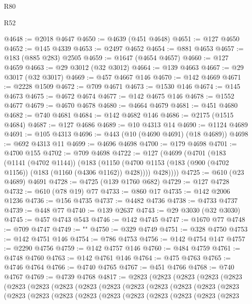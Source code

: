\begin{lexlean}{R80}
\begin{lexlean}{R52}
\begin{coremodule}
{{{{{{{{{{{{{{{{{{{{{{{{{{{{{{{{{{{{{{{{{{{{{{{{{{{{{{{{{{{{{{{{{{{{{{{{{{{{{{{{{{{{{{{{{{{{{{{{{{{{{{{{{{{{{{{{{{{{{{{{{{{{{{{{{{{{{{{{{{{{{{{{{{{{{{{{{{{{{{{{{{{{{{{{{{{{{{{{{{{{{{{{{{{{{{{{{{{{{{@4648 := @2018 @4647
@4650 := @4639 (@451 @4648)
@4651 := @127 @4650
@4652 := @145 @4339
@4653 := @2497 @4652
@4654 := @881 @4653
@4657 := @183 (@885 @283) @2505
@4659 := @1647 (@4654 @4657)
@4660 := @127 @4659
@4663 := @29 @3012 (@32 @3012)
@4664 := @139 @4663
@4667 := @29 @3017 (@32 @3017)
@4669 := @457 @4667 @146
@4670 := @142 @4669
@4671 := @2228 @1509
@4672 := @709 @4671
@4673 := @1530 @146
@4674 := @145 @4673
@4675 := @4672 @4674
@4677 := @142 @4675 @146
@4678 := @1552 @4677
@4679 := @4670 @4678
@4680 := @4664 @4679
@4681 := @451 @4680
@4682 := @740 @4681
@4684 := @142 @4682 @146
@4686 := @2175 (@1515 @4684)
@4687 := @127 @4686
@4689 := @10 @4313 @14
@4690 := @1124 @4689
@4691 := @105 @4313
@4696 := @443 (@10 (@4690 @4691) (@18 @4689))
@4698 := @692 @4313 @11
@4699 := @4696 @4698
@4700 := @179 @4698
@4701 := @4700 @155
@4702 := @709 @4698
@4722 := @127
    (@4699
      (@4701
        (@183
          (@1141 (@4702 @1144))
          (@183
            (@1150 (@4700 @1153 (@183 (@900 (@4702 @1156)) (@183 (@1160 (@4306 @1162)) @428))))
            @428))))
@4725 := @610 (@23 @4689) @4691
@4728 := @4725 (@139 @1760 @682)
@4729 := @127 @4728
@4732 := @610 (@78 @19) @77
@4733 := @860 @17
@4735 := @142 @2006 @1236
@4736 := @156 @4735
@4737 := @4482 @4736
@4738 := @4733 @4737
@4739 := @448 @77
@4740 := @139 @2637
@4743 := @29 @3030 (@32 @3030)
@4745 := @457 @4743 @543
@4746 := @142 @4745
@4747 := @1670 @77
@4748 := @709 @4747
@4749 := "\n"
@4750 := @329 @4749
@4751 := @328 @4750
@4753 := @142 @4751 @146
@4754 := @786 @4753
@4756 := @142 @4754 @147
@4757 := @2290 @4756
@4759 := @142 @4757 @146
@4760 := @484 @4759
@4761 := @4748 @4760
@4763 := @142 @4761 @146
@4764 := @475 @4763
@4765 := @4746 @4764
@4766 := @4740 @4765
@4767 := @451 @4766
@4768 := @740 @4767
@4769 := @4739 @4768
@4817 := @2823
    (@2823
      (@2823
        (@2823
          (@2823
            (@2823
              (@2823
                (@2823
                  (@2823
                    (@2823
                      (@2823
                        (@2823
                          (@2823
                            (@2823
                              (@2823
                                (@2823
                                  (@2823
                                    (@2823
                                      (@2823
                                        (@2823
                                          (@2823
                                            (@2823
                                              (@2823
                                                (@2823
                                                  (@2823
}}}}}}}}}}}}}}}}}}}}}}}}}}}}}}}}}}}}}}}}}}}}}}}}}}}}}}}}}}}}}}}}}}}}}}}}}}}}}}}}}}}}}}}}}}}}}}}}}}}}}}}}}}}}}}}}}}}}}}}}}}}}}}}}}}}}}}}}}}}}}}}}}}}}}}}}}}}}}}}}}}}}}}}}}}}}}}}}}}}}}}}}}}}}}}}}}}}}}}
\end{coremodule}
\end{lexlean}
\end{lexlean}
